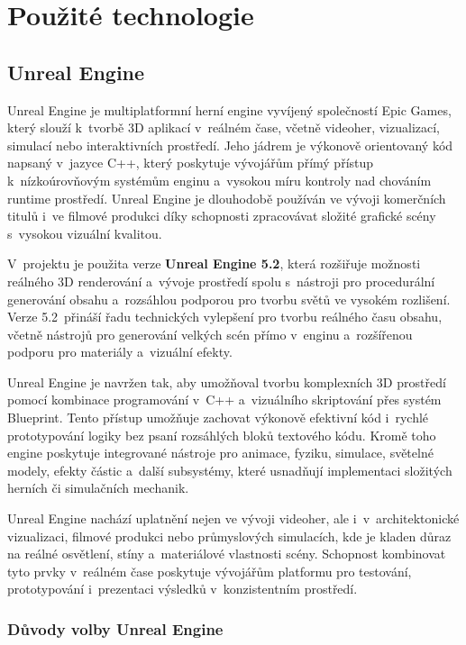 \section{Použité technologie}
\subsection{Unreal Engine}

Unreal Engine\cite{Unreal2025} je multiplatformní herní engine vyvíjený společností Epic Games, který slouží k~tvorbě 3D aplikací v~reálném čase, včetně videoher, vizualizací, simulací nebo interaktivních prostředí. Jeho jádrem je výkonově orientovaný kód napsaný v~jazyce C++, který poskytuje vývojářům přímý přístup k~nízkoúrovňovým systémům enginu a~vysokou míru kontroly nad chováním runtime prostředí. Unreal Engine je dlouhodobě používán ve vývoji komerčních titulů i~ve filmové produkci díky schopnosti zpracovávat složité grafické scény s~vysokou vizuální kvalitou.

V~projektu je použita verze \textbf{Unreal Engine 5.2}, která rozšiřuje možnosti reálného 3D renderování a~vývoje prostředí spolu s~nástroji pro procedurální generování obsahu a~rozsáhlou podporou pro tvorbu světů ve vysokém rozlišení. Verze 5.2~přináší řadu technických vylepšení pro tvorbu reálného času obsahu, včetně nástrojů pro generování velkých scén přímo v~enginu a~rozšířenou podporu pro materiály a~vizuální efekty.

Unreal Engine je navržen tak, aby umožňoval tvorbu komplexních 3D prostředí pomocí kombinace programování v~C++ a~vizuálního skriptování přes systém Blueprint. Tento přístup umožňuje zachovat výkonově efektivní kód i~rychlé prototypování logiky bez psaní rozsáhlých bloků textového kódu. Kromě toho engine poskytuje integrované nástroje pro animace, fyziku, simulace, světelné modely, efekty částic a~další subsystémy, které usnadňují implementaci složitých herních či simulačních mechanik.

Unreal Engine nachází uplatnění nejen ve vývoji videoher, ale i~v~architektonické vizualizaci, filmové produkci nebo průmyslových simulacích, kde je kladen důraz na reálné osvětlení, stíny a~materiálové vlastnosti scény. Schopnost kombinovat tyto prvky v~reálném čase poskytuje vývojářům platformu pro testování, prototypování i~prezentaci výsledků v~konzistentním prostředí.

\subsubsection{Důvody volby Unreal Engine}

